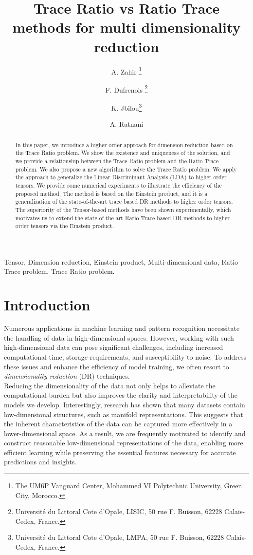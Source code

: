 \documentclass{siamltex}
\title{Trace Ratio vs Ratio Trace methods for multi dimensionality reduction}
\author{ A. Zahir \thanks{The UM6P Vanguard Center, Mohammed VI Polytechnic University, Green 
City, Morocco.} \and F. Dufrenois \thanks{Université du Littoral Cote d'Opale, LISIC, 50 rue F. Buisson, 62228 Calais-Cedex, France.}
\and K. Jbilou\footnotemark[1] \thanks{Université du Littoral Cote d'Opale, LMPA, 50 rue F. Buisson, 62228 Calais-Cedex, France.}
\and A. Ratnani\footnotemark[1]}
\begin{document}
\maketitle

\begin{abstract}
In this paper, we introduce a higher order approach for dimension reduction based on the Trace Ratio problem. We show the existence and uniqueness of the solution, and we provide a relationship between the Trace Ratio problem and the Ratio Trace problem. We also propose a new algorithm to solve the Trace Ratio problem. We apply the approach to generalize the Linear Discriminant Analysis (LDA) to higher order tensors. We provide some numerical experiments to illustrate the efficiency of the proposed method.
The method is based on the Einstein product, and it is a generalization of the state-of-the-art trace based DR methods to higher order tensors. The superiority of the Tensor-based methods have been shown experimentally, which motivates us to extend the state-of-the-art Ratio Trace based DR methods to higher order tensors via the Einstein product.
\end{abstract}

\begin{keywords}
Tensor, Dimension reduction, Einstein product, Multi-dimensional data, Ratio Trace problem, Trace Ratio problem.
\end{keywords}

\section{Introduction}\label{sec:intro}
Numerous applications in machine learning and pattern recognition \cite{fukunaga2013introduction} necessitate the handling of data in high-dimensional spaces. However, working with such high-dimensional data can pose significant challenges, including increased computational time, storage requirements, and susceptibility to noise. To address these issues and enhance the efficiency of model training, we often resort to \textit{dimensionality reduction} (DR) techniques.\\
Reducing the dimensionality of the data not only helps to alleviate the computational burden but also improves the clarity and interpretability of the models we develop. Interestingly, research has shown that many datasets contain low-dimensional structures, such as manifold representations. This suggests that the inherent characteristics of the data can be captured more effectively in a lower-dimensional space. As a result, we are frequently motivated to identify and construct reasonable low-dimensional representations of the data, enabling more efficient learning while preserving the essential features necessary for accurate predictions and insights.
\end{document}
